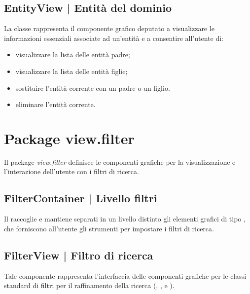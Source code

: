 \documentclass[10pt,a4paper,headinclude,footinclude,hidelinks]{scrreprt} %
\begin{document}
	\subsection[EntityView]{EntityView | Entità del dominio}
	\label{sec:stage:design:view:entity-widget}
	La classe \textit{} rappresenta il componente grafico deputato a visualizzare le informazioni essenziali associate ad un'entità e a consentire all'utente di:
	\begin{itemize}
	\item visualizzare la lista delle entità padre;
	\item visualizzare la lista delle entità figlie;
	\item sostituire l'entità corrente con un padre o un figlio.
	\item eliminare l'entità corrente.
	\end{itemize}

	\section{Package view.filter}
	\label{sec:stage:design:view.filter}
	Il package \textit{view.filter} definisce le componenti grafiche per la visualizzazione e l'interazione dell'utente con i filtri di ricerca.

	\subsection[FilterContainer]{FilterContainer | Livello filtri}
	\label{sec:stage:design:view.filter:filter-container}
	Il \textit{} raccoglie e mantiene separati in un livello distinto gli elementi grafici di tipo \textit{}, che forniscono all'utente gli strumenti per impostare i filtri di ricerca.

	\subsection[FilterView]{FilterView | Filtro di ricerca}
	\label{sec:stage:design:view.filter:filter}
	Tale componente rappresenta l'interfaccia delle componenti grafiche per le classi standard di filtri per il raffinamento della ricerca (\textit{}, \textit{}, \textit{} e \textit{}).
\end{document}
